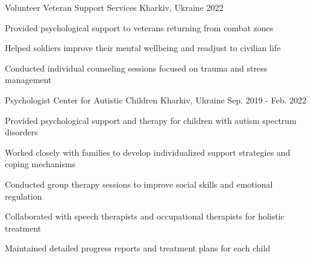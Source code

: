 


\begin{cventries}


\cventry
{Volunteer} %
{Veteran Support Services} %
{Kharkiv, Ukraine} %
{2022} %
{ %
\begin{cvitems}
\item {Provided psychological support to veterans returning from combat zones}
\item {Helped soldiers improve their mental wellbeing and readjust to civilian life}
\item {Conducted individual counseling sessions focused on trauma and stress management}
\end{cvitems}
}


\cventry
{Psychologist} %
{Center for Autistic Children} %
{Kharkiv, Ukraine} %
{Sep. 2019 - Feb. 2022} %
{ %
\begin{cvitems}
\item {Provided psychological support and therapy for children with autism spectrum disorders}
\item {Worked closely with families to develop individualized support strategies and coping mechanisms}
\item {Conducted group therapy sessions to improve social skills and emotional regulation}
\item {Collaborated with speech therapists and occupational therapists for holistic treatment}
\item {Maintained detailed progress reports and treatment plans for each child}
\end{cvitems}
}



\end{cventries}
